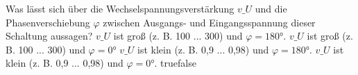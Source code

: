     {Was lässt sich über die Wechselspannungsverstärkung $v\_U$ und die Phasenverschiebung $\varphi$ zwischen Ausgangs- und Eingangsspannung dieser Schaltung aussagen?}
    {$v\_U$ ist groß (z. B. 100 ... 300) und $\varphi = 180 °$.}
    {$v\_U$ ist groß (z. B. 100 ... 300) und $\varphi = 0 °$}
    {$v\_U$ ist klein (z. B. 0,9 ... 0,98) und $\varphi = 180 °$.}
    {$v\_U$ ist klein (z. B. 0,9 ... 0,98) und $\varphi = 0 °$.}
    {true}{false}